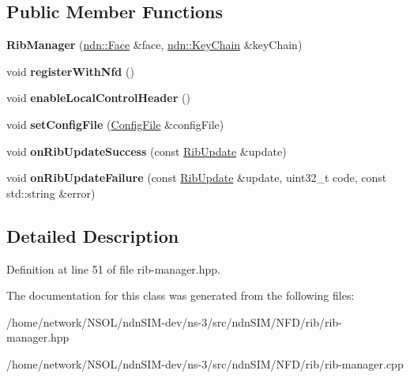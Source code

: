 \subsection*{Public Member Functions}
\begin{DoxyCompactItemize}
\item 
{\bfseries Rib\+Manager} (\hyperlink{classndn_1_1Face}{ndn\+::\+Face} \&face, \hyperlink{classndn_1_1security_1_1KeyChain}{ndn\+::\+Key\+Chain} \&key\+Chain)\hypertarget{classnfd_1_1rib_1_1RibManager_ad13e4523a01cf608279f5a1f1f238e80}{}\label{classnfd_1_1rib_1_1RibManager_ad13e4523a01cf608279f5a1f1f238e80}

\item 
void {\bfseries register\+With\+Nfd} ()\hypertarget{classnfd_1_1rib_1_1RibManager_a06921603929cae79cad45309a8d215ef}{}\label{classnfd_1_1rib_1_1RibManager_a06921603929cae79cad45309a8d215ef}

\item 
void {\bfseries enable\+Local\+Control\+Header} ()\hypertarget{classnfd_1_1rib_1_1RibManager_aafc801187a1c14403ff093ab7196bafe}{}\label{classnfd_1_1rib_1_1RibManager_aafc801187a1c14403ff093ab7196bafe}

\item 
void {\bfseries set\+Config\+File} (\hyperlink{classnfd_1_1ConfigFile}{Config\+File} \&config\+File)\hypertarget{classnfd_1_1rib_1_1RibManager_a11ff92e48d72156ed124b90f6dcb8ff9}{}\label{classnfd_1_1rib_1_1RibManager_a11ff92e48d72156ed124b90f6dcb8ff9}

\item 
void {\bfseries on\+Rib\+Update\+Success} (const \hyperlink{classnfd_1_1rib_1_1RibUpdate}{Rib\+Update} \&update)\hypertarget{classnfd_1_1rib_1_1RibManager_a6a76429e5f76b077ac9fcd85e6f76fd4}{}\label{classnfd_1_1rib_1_1RibManager_a6a76429e5f76b077ac9fcd85e6f76fd4}

\item 
void {\bfseries on\+Rib\+Update\+Failure} (const \hyperlink{classnfd_1_1rib_1_1RibUpdate}{Rib\+Update} \&update, uint32\+\_\+t code, const std\+::string \&error)\hypertarget{classnfd_1_1rib_1_1RibManager_a32c1cd29c0d587b9219d32f2c875116c}{}\label{classnfd_1_1rib_1_1RibManager_a32c1cd29c0d587b9219d32f2c875116c}

\end{DoxyCompactItemize}


\subsection{Detailed Description}


Definition at line 51 of file rib-\/manager.\+hpp.



The documentation for this class was generated from the following files\+:\begin{DoxyCompactItemize}
\item 
/home/network/\+N\+S\+O\+L/ndn\+S\+I\+M-\/dev/ns-\/3/src/ndn\+S\+I\+M/\+N\+F\+D/rib/rib-\/manager.\+hpp\item 
/home/network/\+N\+S\+O\+L/ndn\+S\+I\+M-\/dev/ns-\/3/src/ndn\+S\+I\+M/\+N\+F\+D/rib/rib-\/manager.\+cpp\end{DoxyCompactItemize}
